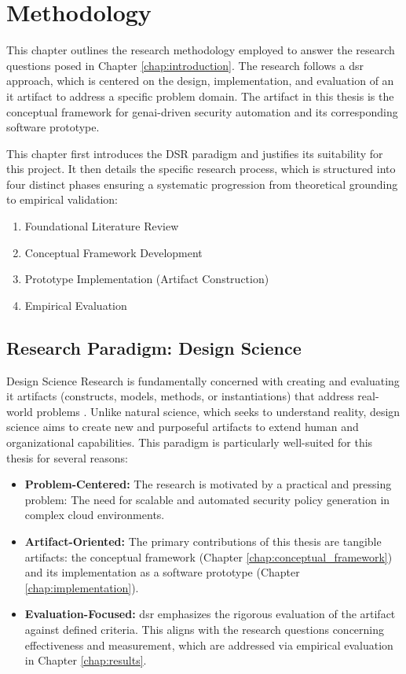 \chapter{Methodology}
\label{chap:methodology}

This chapter outlines the research methodology employed to answer the research questions posed in Chapter \ref{chap:introduction}. The research follows a \gls{dsr} \cite{hevner_design_2004} approach, which is centered on the design, implementation, and evaluation of an \gls{it} artifact to address a specific problem domain. The artifact in this thesis is the conceptual framework for \gls{genai}-driven security automation and its corresponding software prototype.

This chapter first introduces the DSR paradigm and justifies its suitability for this project. It then details the specific research process, which is structured into four distinct phases ensuring a systematic progression from theoretical grounding to empirical validation:

\begin{enumerate}
    \item Foundational Literature Review
    \item Conceptual Framework Development
    \item Prototype Implementation (Artifact Construction)
    \item Empirical Evaluation
\end{enumerate}

\section{Research Paradigm: Design Science}
\label{sec:research_paradigm}

Design Science Research is fundamentally concerned with creating and evaluating \gls{it} artifacts (constructs, models, methods, or instantiations) that address real-world problems \cite{hevner_design_2004}. Unlike natural science, which seeks to understand reality, design science aims to create new and purposeful artifacts to extend human and organizational capabilities. This paradigm is particularly well-suited for this thesis for several reasons:
\begin{itemize}
    \item \textbf{Problem-Centered:} The research is motivated by a practical and pressing problem: The need for scalable and automated security policy generation in complex cloud environments.
    \item \textbf{Artifact-Oriented:} The primary contributions of this thesis are tangible artifacts: the conceptual framework (Chapter \ref{chap:conceptual_framework}) and its implementation as a software prototype (Chapter \ref{chap:implementation}).
    \item \textbf{Evaluation-Focused:} \gls{dsr} emphasizes the rigorous evaluation of the artifact against defined criteria. This aligns with the research questions concerning effectiveness and measurement, which are addressed via empirical evaluation in Chapter \ref{chap:results}.
\end{itemize}

